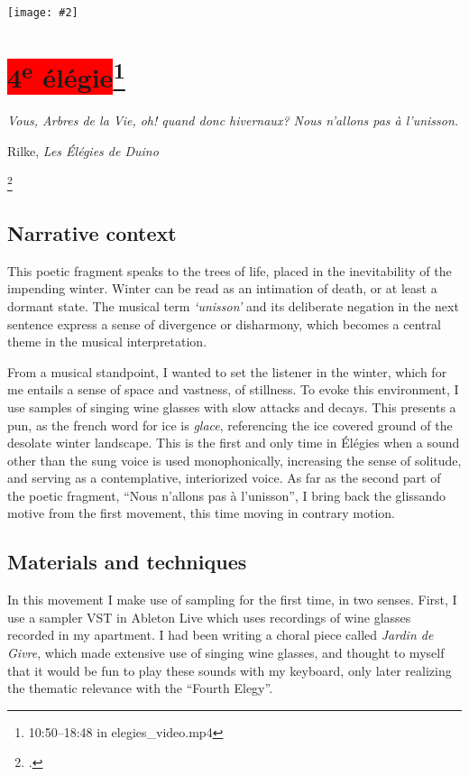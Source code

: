 \documentclass[12pt,twoside,maitrise]{dms_ks}
\newcommand{\customincludeexamples}[4][]{%
    \begin{example}[H]
        \centering
        \texttt{[image: \#2]}
        \caption{#4}
	\label{#3} 
    \end{example}
}
\theoremstyle{definition}
\begin{document}
{\customincludeexamples[width=\textwidth]{3e_4}{ex:3e_4}{The end of the second variation, an improvisational section, and the three synthetic bell tolls that end the movement (m. 26 to p.~5, sys.~2).}

\section{\colorbox{red}{4\textsuperscript{e} élégie}\footnote{10:50--18:48 in elegies\_video.mp4}}

\epigraph{\textit{Vous, Arbres de la Vie, oh! quand donc hivernaux? Nous n'allons pas à l'unisson.}}{Rilke, \textit{Les Élégies de Duino}\protect\footnotemark}

\footcitetext[39]{rilke_egies_1986}

\subsection{Narrative context}

This poetic fragment speaks to the trees of life, placed in the inevitability of the impending winter.
Winter can be read as an intimation of death, or at least a dormant state.
The musical term \textit{`unisson'} and its deliberate negation in the next sentence express a sense of divergence or disharmony, which becomes a central theme in the musical interpretation.

From a musical standpoint, I wanted to set the listener in the winter, which for me entails a sense of space and vastness, of stillness.
To evoke this environment, I use samples of singing wine glasses with slow attacks and decays.
This presents a pun, as the french word for ice is \textit{glace}, referencing the ice covered ground of the desolate winter landscape.
This is the first and only time in Élégies when a sound other than the sung voice is used monophonically, increasing the sense of solitude, and serving as a contemplative, interiorized voice.
As far as the second part of the poetic fragment, “Nous n'allons pas à l'unisson”, I bring back the glissando motive from the first movement, this time moving in contrary motion.

\subsection{Materials and techniques}

In this movement I make use of sampling for the first time, in two senses.
First, I use a sampler VST in Ableton Live which uses recordings of wine glasses recorded in my apartment.
I had been writing a choral piece called \textit{Jardin de Givre}, which made extensive use of singing wine glasses, and thought to myself that it would be fun to play these sounds with my keyboard, only later realizing the thematic relevance with the “Fourth Elegy”.

}
\end{document}
